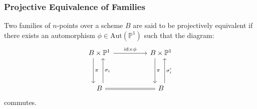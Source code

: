 \subsubsection{Projective Equivalence of Families}
Two families of $n$-points over a scheme $B$ are said to be projectively equivalent if there exists an automorphism $\phi \in \text{Aut}(\mathbb{P}^{1})$ such that the diagram:
\[
    \begin{tikzcd}
        B \times \mathbb{P}^{1} & & B \times \mathbb{P}^{1}\\
                                & & \\
        B & & B
        \arrow["\pi",xshift = -2ex, from = 1-1, to = 3-1]
        \arrow[ swap, "\sigma_{i}", xshift = 1.2ex,from = 3-1, to = 1-1]
        \arrow["\pi",xshift = -2ex, from = 1-3, to = 3-3]
        \arrow[ swap, "\sigma_{i}'", xshift = 1.2ex,from = 3-3, to = 1-3]
        \arrow["\text{id}\times \phi", from = 1-1, to = 1-3]
        \arrow[equal,  from = 3-1, to= 3-3]
    \end{tikzcd}
\]
commutes.

